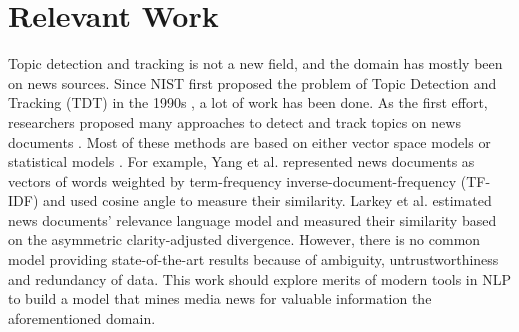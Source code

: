 \section{Relevant Work}
Topic detection and tracking is not a new field, and the domain has mostly been on news sources. Since NIST first proposed the problem of Topic Detection and Tracking (TDT) in the 1990s \cite{graff1999tdt}, a lot of work has been done. As the first effort, researchers proposed many approaches to detect and track topics on news documents \cite{lavrenko2002relevance} \cite{larkey2004language}. Most of these methods are based on either vector space models \cite{yang1999learning} or statistical models \cite{lavrenko2002relevance} \cite{larkey2004language}. For example, Yang et al. \cite{yang1999learning} represented news documents as vectors of words weighted by term-frequency inverse-document-frequency (TF-IDF) and used cosine angle to measure their similarity. Larkey et al.  \cite{larkey2004language} estimated news documents’ relevance language model and measured their similarity based on the asymmetric clarity-adjusted divergence. However, there is no common model providing state-of-the-art results because of ambiguity, untrustworthiness and redundancy of data. This work should explore merits of modern tools in NLP to build a model that mines media news for valuable information the aforementioned domain. 